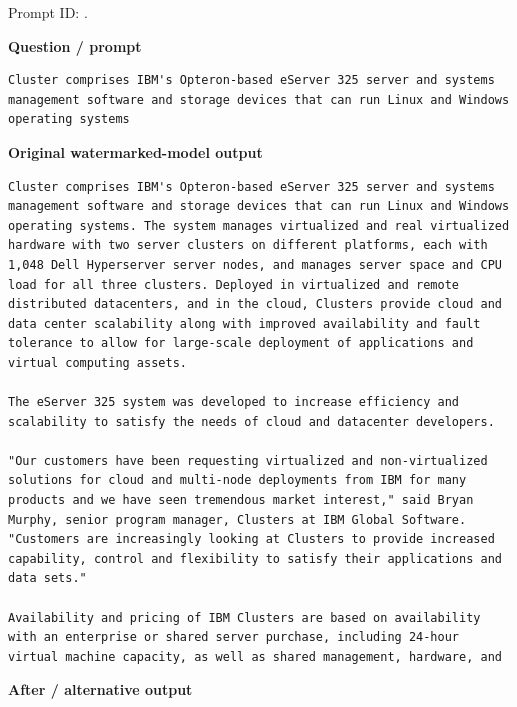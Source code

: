 Prompt ID:
\texttt{}.

\textbf{Question / prompt}

\begin{Verbatim}
Cluster comprises IBM's Opteron-based eServer 325 server and systems management software and storage devices that can run Linux and Windows operating systems
\end{Verbatim}

\textbf{Original watermarked-model output}

\begin{Verbatim}
Cluster comprises IBM's Opteron-based eServer 325 server and systems management software and storage devices that can run Linux and Windows operating systems. The system manages virtualized and real virtualized hardware with two server clusters on different platforms, each with 1,048 Dell Hyperserver server nodes, and manages server space and CPU load for all three clusters. Deployed in virtualized and remote distributed datacenters, and in the cloud, Clusters provide cloud and data center scalability along with improved availability and fault tolerance to allow for large-scale deployment of applications and virtual computing assets.

The eServer 325 system was developed to increase efficiency and scalability to satisfy the needs of cloud and datacenter developers.

"Our customers have been requesting virtualized and non-virtualized solutions for cloud and multi-node deployments from IBM for many products and we have seen tremendous market interest," said Bryan Murphy, senior program manager, Clusters at IBM Global Software. "Customers are increasingly looking at Clusters to provide increased capability, control and flexibility to satisfy their applications and data sets."

Availability and pricing of IBM Clusters are based on availability with an enterprise or shared server purchase, including 24-hour virtual machine capacity, as well as shared management, hardware, and
\end{Verbatim}

\textbf{After / alternative output}


